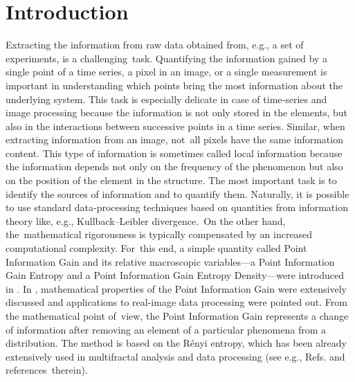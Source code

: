 \documentclass[entropy,article,accept,moreauthors,pdftex,10pt,a4paper]{mdpi}
\begin{document}
\section{Introduction}
\label{}
Extracting the information from raw data obtained from, e.g., a set of experiments, is a challenging~task. Quantifying the information gained by a single point of a time series, a pixel in an image, or a single measurement is important in understanding which points bring the most information about the underlying system. This task is especially delicate in case of time-series and image processing because the information is not only stored in the elements, but also in the interactions between successive points in a time series. Similar, when extracting information from an image, not~all pixels have the same information content. This type of information is sometimes called {local information} because the information depends not only on the frequency of the phenomenon but also on the position of the element in the structure. The most important task is to identify the sources of information and to quantify them. Naturally, it is possible to use standard data-processing techniques based on quantities from information theory like, e.g., Kullback--Leibler divergence.~On the other hand, the~mathematical rigorousness is typically compensated by an increased computational complexity. For~this end, a simple quantity called {Point Information Gain} and its relative macroscopic variables---a Point Information Gain Entropy and a Point Information Gain Entropy Density---were introduced in \cite{Ryc16b}. In \cite{Ryc16a}, mathematical properties of the Point Information Gain were extensively discussed and applications to real-image data processing were pointed out. From the mathematical point of~view, the Point Information Gain represents a change of information after removing an element of a particular phenomena from a distribution. The method is based on the R\'{e}nyi entropy, which has been already extensively used in multifractal analysis and data processing (see e.g., Refs. \cite{Ji14,Ryc16a,Ko14,Ji12} and references~therein).
\end{document}
